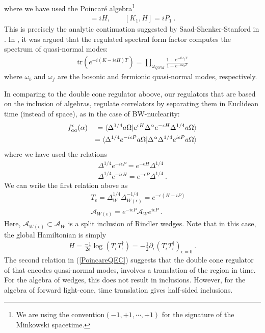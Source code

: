 \documentclass[a4paper,11pt]{article}
\theoremstyle{definition}
\newcommand{\mA}{\mathcal{A}}
\newcommand{\nn}{\nonumber}
\newcommand{\lb}{\left(}
\newcommand{\rb}{\right)}
\newcommand{\ep}{\epsilon}
\newcommand{\p}{\partial}
\newcommand{\tr}{\text{tr}}
\begin{document}
where we have used the Poincaré algebra\footnote{We are using the  convention$(-1,+1,\cdots, +1)$ for the signature of the Minkowski spacetime.}
\begin{eqnarray}
     [K_1,P_1]=i H,\qquad [K_1,H]=i P_1\ .
\end{eqnarray}
This is precisely the analytic continuation suggested by Saad-Shenker-Stanford in \cite{saad2018semiclassical}. In \cite{chen2024comments}, it was argued that the regulated spectral form factor computes the spectrum of quasi-normal modes:
\begin{eqnarray}
    \tr(e^{-i(K-i\ep H)T})=\prod_{\omega_{QNM}}\frac{1+e^{-i\omega_f T}}{1-e^{-i\omega_b T}}
\end{eqnarray}
where $\omega_b$ and $\omega_f$ are the bosonic and fermionic quasi-normal modes, respectively.

In comparing to the double cone regulator aboove, our regulators that are based on the inclusion of algebras, regulate correlators by separating them in Euclidean time (instead of space), as in the case of BW-nuclearity:
\begin{eqnarray}
    f_{aa}^{\ep}(\alpha)&&=\braket{\Delta^{1/4}a\Omega|e^{\ep H}\Delta^{\alpha} e^{-\ep H}\Delta^{1/4}a\Omega}\nn\\
    &&=\braket{\Delta^{1/4}e^{-i\ep P} a\Omega|\Delta^\alpha\Delta^{1/4}e^{i\ep P}a\Omega}
\end{eqnarray}
where we have used the relations 
\begin{eqnarray}\label{PoincareQEC}
    \Delta^{1/4}e^{-i\ep P}=e^{-\ep H}\Delta^{1/4}\nn\\
    \Delta^{1/4}e^{-i\ep H}=e^{-\ep P}\Delta^{1/4}\ .
\end{eqnarray}
We can write the first relation above as
\begin{eqnarray}
   &&T_\ep=\Delta^{1/4}_W\Delta_{W(\ep)}^{-1/4}= e^{-\ep (H-i P)}\nn\\
   &&\mA_{W(\ep)}=e^{-i\ep P}\mA_W e^{i\ep P}\ .
\end{eqnarray}
Here, $\mA_{W(\ep)}\subset \mA_W$ is a split inclusion of Rindler wedges. Note that in this case, the global Hamiltonian is simply
\begin{eqnarray}
    H=\frac{-1}{2\ep}\log\lb T_\ep T_\ep^\dagger\rb=-\frac{1}{2}\p_\ep\lb T_\ep T_\ep^\dagger\rb_{\ep=0}\ .
\end{eqnarray}
The second relation in (\ref{PoincareQEC}) suggests that the double cone regulator of \cite{chen2024comments} that encodes quasi-normal modes, involves a translation of the region in time. For the algebra of wedges, this does not result in inclusions. However, for the algebra of forward light-cone, time translation gives half-sided inclusions. 
\end{document}
